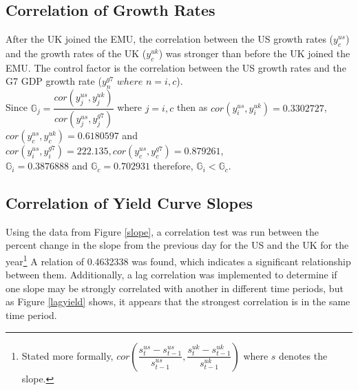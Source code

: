 \documentclass[12pt]{article}
\begin{document}
\subsection{Correlation of Growth Rates}
After the UK joined the EMU, the correlation between the US growth rates ($y^{us}_c$) and the growth rates of the UK ($y^{uk}_c$) was stronger than before the UK joined the EMU. The control factor is the correlation between the US growth rates and the G7 GDP growth rate ($y^{g7}_{n}$ $where$ $n=i,c$).\\

Since $\mathbb{G}_{j} = \dfrac{cor(y^{us}_j,y^{uk}_j)}{cor(y^{us}_j,y^{g7}_j)}$ where $j = i,c$ then as $cor(y^{us}_i,y^{uk}_i) = 0.3302727$,\\ $cor(y^{us}_c,y^{uk}_c) = 0.6180597$ and $cor(y^{us}_i,y^{g7}_i) = \num{222.135}, cor(y^{us}_c,y^{g7}_c) = 0.879261$,\\ $\mathbb{G}_{i} = 0.3876888$ and $\mathbb{G}_{c} = 0.702931$ therefore, $\mathbb{G}_{i} < \mathbb{G}_{c}$.


\subsection{Correlation of Yield Curve Slopes}
Using the data from Figure \ref{slope}, a correlation test was run between the percent change in the slope from the previous day for the US and the UK for the year\footnote{Stated more formally, $cor\left( \dfrac{s^{us}_t-s^{us}_{t-1}}{s^{us}_{t-1}},\dfrac{s^{uk}_t-s^{uk}_{t-1}}{s^{uk}_{t-1}}\right)$ where $s$ denotes the slope.} A relation of 0.4632338 was found, which indicates a significant relationship between them. Additionally, a lag correlation was implemented to determine if one slope may be strongly correlated with another in different time periods, but as Figure \ref{lagyield} shows, it appears that the strongest correlation is in the same time period.
\end{document}
